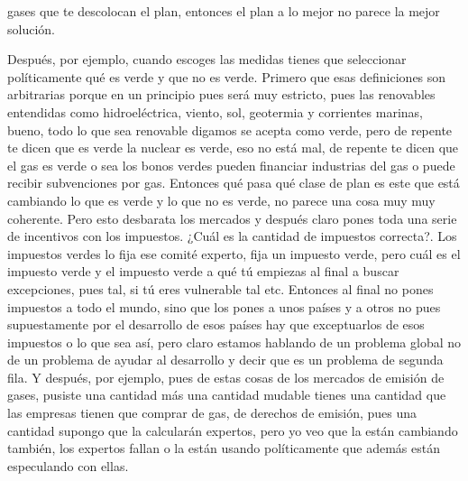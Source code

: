 gases que te descolocan el plan, entonces el plan a lo mejor no parece la mejor solución.

Después, por ejemplo, cuando escoges las medidas tienes que seleccionar políticamente qué es verde y que no es verde. Primero que esas definiciones son arbitrarias porque en un principio pues será muy estricto, pues las renovables entendidas como hidroeléctrica, viento, sol, geotermia y corrientes marinas, bueno, todo lo que sea renovable digamos se acepta como verde, pero de repente te dicen que es verde la nuclear es verde, eso no está mal, de repente te dicen que el gas es verde o sea los bonos verdes pueden financiar industrias del gas o puede recibir subvenciones por gas. Entonces qué pasa qué clase de plan es este que está cambiando lo que es verde y lo que no es verde, no parece una cosa muy muy coherente. Pero esto desbarata los mercados y después claro pones toda una serie de incentivos con los impuestos. ¿Cuál es la cantidad de impuestos correcta?. Los impuestos verdes lo fija ese comité experto, fija un impuesto verde, pero cuál es el impuesto verde y el impuesto verde a qué tú empiezas al final a buscar excepciones, pues tal, si tú eres vulnerable tal etc. Entonces al final no pones impuestos a todo el mundo, sino que los pones a unos países y a otros no pues supuestamente por el desarrollo de esos países hay que exceptuarlos de esos impuestos o lo que sea así, pero claro estamos hablando de un problema global no de un problema de ayudar al desarrollo y decir que es un problema de segunda fila. Y después, por ejemplo, pues de estas cosas de los mercados de emisión de gases, pusiste una cantidad más una cantidad mudable tienes una cantidad que las empresas tienen que comprar de gas, de derechos de emisión, pues una cantidad supongo que la calcularán expertos, pero yo veo que la están cambiando también, los expertos fallan o la están usando políticamente que además están especulando con ellas.

